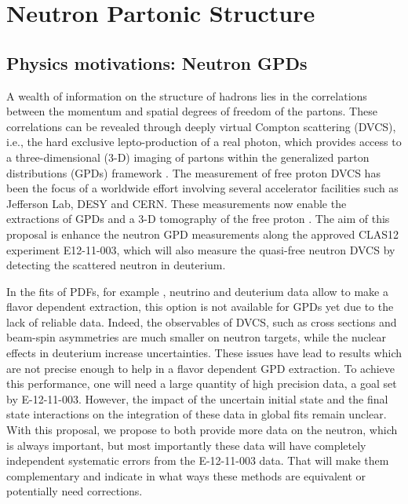 \chapter{Neutron Partonic Structure}
\label{chap:physics}

\section{Physics motivations: Neutron GPDs}

A wealth of information on the structure of hadrons lies in the correlations 
between the momentum and spatial degrees of freedom of the partons. These 
correlations can be revealed through deeply virtual Compton scattering (DVCS), 
i.e., the hard exclusive lepto-production of a real photon, which provides 
access to a three-dimensional (3-D) imaging of partons within the generalized 
parton distributions (GPDs) framework 
\cite{Mueller:1998fv,
Ji:1996ek,
PhysRevD.55.7114,
Radyushkin:1996nd,
PhysRevD.56.5524}. The measurement of free proton DVCS has been the focus of a 
worldwide effort \cite{PhysRevLett.87.182002,
   PhysRevLett.87.182001,
   PhysRevD.75.011103,
   Girod:2007aa,
   PhysRevC.92.055202,
   PhysRevLett.99.242501,
   PhysRevC.80.035206,
   PhysRevLett.114.032001,
   Jo:2015ema}
involving several accelerator facilities such as Jefferson Lab, DESY and  
CERN. These measurements now enable the extractions of GPDs and a 3-D 
tomography of the free proton \cite{Guidal:2013rya, PhysRevD.95.011501}. The 
aim of this proposal is enhance the neutron GPD measurements along the approved 
CLAS12 experiment E12-11-003, which will also measure the quasi-free neutron 
DVCS by detecting the scattered neutron in deuterium.  

In the fits of PDFs, for example \cite{Ball:2014uwa} , neutrino and deuterium 
data allow to make a flavor dependent extraction, this option is not available 
for GPDs yet due to the lack of reliable data. Indeed, the observables of DVCS, 
such as cross sections and beam-spin asymmetries are much smaller on neutron 
targets, while the nuclear effects in deuterium increase uncertainties. These 
issues have lead to results \cite{Mazouz:2007aa} which are not precise enough 
to help in a flavor dependent GPD extraction. To achieve this performance, one 
will need a large quantity of high precision data, a goal set by E-12-11-003.  
However, the impact of the uncertain initial state and the
final state interactions on the integration of these data in global fits remain 
unclear. With this proposal, we propose to both provide more data on the neutron,
which is always important, but most importantly these data will have completely 
independent systematic errors from the E-12-11-003 data. That will make them complementary
and indicate in what ways these methods are equivalent or potentially need 
corrections.

